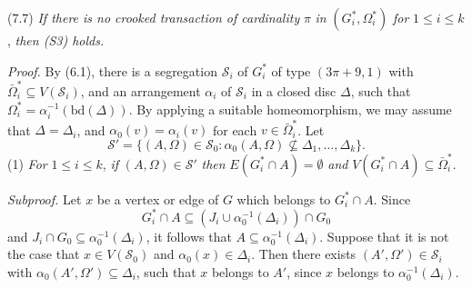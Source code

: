 \stmt
(7.7) \textit{If there is no crooked transaction of cardinality} $\pi$ \textit{in} $(G_i^*, \Omega_i^*)$ \textit{for} $1 \le i \le k$, \textit{then (S3) holds.}

\textit{Proof.} By (6.1), there is a segregation $\mathcal{S}_i$ of $G_i^*$ of type $(3\pi + 9, 1)$ with $\bar{\Omega}_i^* \subseteq V(\mathcal{S}_i)$, and an arrangement $\alpha_i$ of $\mathcal{S}_i$ in a closed disc $\Delta$, such that $\Omega_i^* = \alpha_i^{-1}(\text{bd}(\Delta))$. By applying a suitable homeomorphism, we may assume that $\Delta = \Delta_i$, and $\alpha_0(v) = \alpha_i(v)$ for each $v \in \bar{\Omega}_i^*$. Let
\begin{equation*}
\mathcal{S}' = \{(A, \Omega) \in \mathcal{S}_0 \colon \alpha_0(A, \Omega) \not\subseteq \Delta_1, \dots, \Delta_k\}.
\end{equation*}
\hspace*{12pt}(1) \textit{For} $1 \le i \le k$, \textit{if} $(A, \Omega) \in \mathcal{S}'$ \textit{then} $E(G_i^* \cap A) = \emptyset$ \textit{and} $V(G_i^* \cap A) \subseteq \bar{\Omega}_i^*$.

\textit{Subproof.} Let $x$ be a vertex or edge of $G$ which belongs to $G_i^* \cap A$. Since
\begin{equation*}
G_i^* \cap A \subseteq (J_i \cup \alpha_0^{-1}(\Delta_i)) \cap G_0
\end{equation*}
and $J_i \cap G_0 \subseteq \alpha_0^{-1}(\Delta_i)$, it follows that $A \subseteq \alpha_0^{-1}(\Delta_i)$. Suppose that it is not the case that $x \in V(\mathcal{S}_0)$ and $\alpha_0(x) \in \Delta_i$. Then there exists $(A', \Omega') \in \mathcal{S}_i$ with $\alpha_0(A', \Omega') \subseteq \Delta_i$, such that $x$ belongs to $A'$, since $x$ belongs to $\alpha_0^{-1}(\Delta_i)$.
